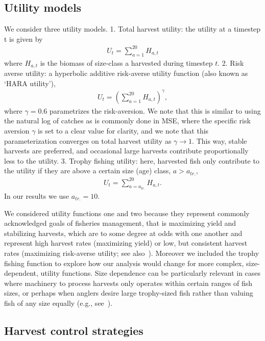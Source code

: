 \documentclass[floatfix,nofootinbib,longbibliography,notitlepage]{revtex4-2}
\begin{document}
\subsection{Utility models}
\label{sec:utility}

We consider three utility models. 
1. Total harvest utility: the utility at a timestep t is given by
\begin{align}
    U_t = \sum_{a=1}^{20} H_{a,t}
\end{align}
where $H_{a,t}$ is the biomass of size-class a harvested during timestep $t$. 
2. Risk averse utility: a hyperbolic additive risk-averse utility function (also known as ‘HARA utility’), 
\begin{align}
    U_t = \left(
    	\sum_{a=1}^{20} H_{a,t}
    \right)^\gamma,
\end{align}
where $\gamma=0.6$ parametrizes the risk-aversion. 
We note that this is similar to using the natural log of catches as is commonly done in MSE, where the specific risk aversion $\gamma$ is set to a clear value for clarity, and we note that this parameterization converges on total harvest utility as $\gamma\to1$.  
This way, stable harvests are preferred, and occasional large harvests contribute proportionally less to the utility. 
3. Trophy fishing utility: here, harvested fish only contribute to the utility if they are above a certain size (age) class, $a > a_{tr.}$,
\begin{align}
    U_t = \sum_{a=a_{tr.}}^{20} H_{a,t}.
\end{align}
In our results we use $a_{tr.}=10$.

We considered utility functions one and two because they represent commonly acknowledged goals of fisheries management, that is maximizing yield and stabilizing harvests, which are to some degree at odds with one another and represent high harvest rates (maximizing yield) or low, but consistent harvest rates (maximizing risk-averse utility; see also~\cite{walters-parma-1996,collie2021}).  
Moreover we included the trophy fishing function to explore how our analysis would change for more complex, size-dependent, utility functions. 
Size dependence can be particularly relevant in cases where machinery to process harvests only operates within certain ranges of fish sizes, or perhaps when anglers desire large trophy-sized fish rather than valuing fish of any size equally (e.g., see~\cite{murphy-willis-book}).

\subsection{Harvest control strategies}
\label{sec:strategies}
\end{document}
